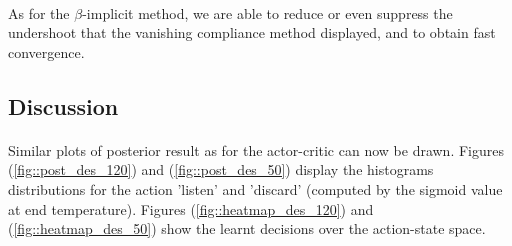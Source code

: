 \documentclass[a4paper]{report}
\begin{document}
{{{{				\paragraph{} As for the $\beta$-implicit method, we are able to reduce or even suppress the undershoot that the vanishing compliance method displayed, and to obtain fast convergence. 				
			}
			\subsection{Discussion}
			{
				\paragraph{} Similar plots of posterior result as for the actor-critic can now be drawn. Figures (\ref{fig::post_des_120}) and (\ref{fig::post_des_50}) display the histograms distributions for the action 'listen' and 'discard' (computed by the sigmoid value at end temperature). Figures (\ref{fig::heatmap_des_120}) and (\ref{fig::heatmap_des_50}) show the learnt decisions over the action-state space. 
				
}}}}
\end{document}
